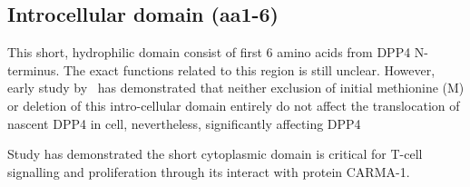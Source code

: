 \subsection{Introcellular domain (aa1-6)}

This short, hydrophilic domain consist of first 6 amino acids from DPP4 N-terminus. The exact functions related to this region is still unclear. However, early study by~\citet{Hong1990} has demonstrated that neither exclusion of initial methionine (M) or deletion of this intro-cellular domain entirely do not affect the translocation of nascent DPP4 in cell, nevertheless, significantly affecting DPP4 

Study has demonstrated the short cytoplasmic domain is critical for T-cell signalling and proliferation through its interact with protein CARMA-1. \cite{Ohnuma_2007}